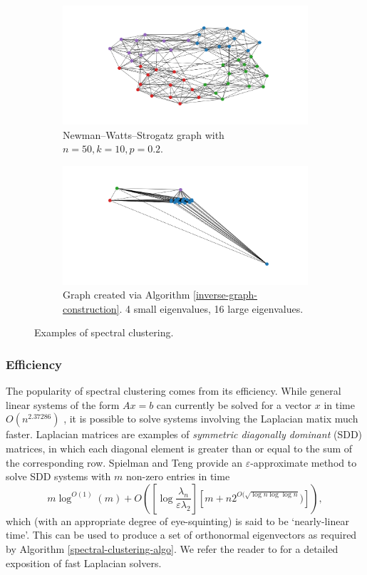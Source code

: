 \documentclass[a4paper,11pt]{article}
\theoremstyle{definition}
\begin{document}
\begin{figure}
\begin{subfigure}[b]{0.49\textwidth}
\centering
\includegraphics[width=\textwidth]{newman-watts-strogatz}
\caption{Newman–Watts–Strogatz graph with $n = 50, k = 10, p = 0.2$.}
\end{subfigure}
\hfill
\begin{subfigure}[b]{0.49\textwidth}
\centering
\includegraphics[width=\textwidth]{spectral-gap}
\caption{Graph created via Algorithm \ref{inverse-graph-construction}. 4 small eigenvalues, 16 large eigenvalues.}
\end{subfigure}
\caption{Examples of spectral clustering.}\label{spectral-clustering-algo-results}
\end{figure}

\subsubsection{Efficiency}

The popularity of spectral clustering comes from its efficiency. While general linear systems of the form $Ax = b$ can currently be solved for a vector $x$ in time $O(n^{2.37286})$ \cite{fast-matsolve}, it is possible to solve systems involving the Laplacian matix much faster. Laplacian matrices are examples of \emph{symmetric diagonally dominant} (SDD) matrices, in which each diagonal element is greater than or equal to the sum of the corresponding row. Spielman and Teng \cite{fast-laplacian} provide an $\varepsilon$-approximate method to solve SDD systems with $m$ non-zero entries in time
\[
m \log^{O(1)}(m) + O\left(\left[\log \frac{\lambda_n}{\varepsilon \lambda_2} \right] \left[m + n 2^{O(\sqrt{\log n \log \log n}}) \right] \right),
\]
which (with an appropriate degree of eye-squinting) is said to be `nearly-linear time'. This can be used to produce a set of orthonormal eigenvectors as required by Algorithm \ref{spectral-clustering-algo}. We refer the reader to \cite{vishnoi} for a detailed exposition of fast Laplacian solvers.
\end{document}
